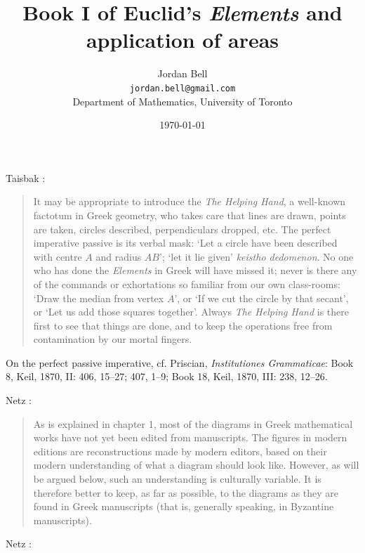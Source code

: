 \documentclass{article}
\begin{document}
\title{Book I of Euclid's {\em Elements} and application of areas} 
\author{Jordan Bell\\ \texttt{jordan.bell@gmail.com}\\Department of Mathematics, University of Toronto}
\date{\today}

\maketitle

Taisbak \cite[pp.~28--29]{data}:

\begin{quote}
It may be appropriate to introduce the {\em The Helping Hand}, a well-known factotum in Greek
geometry, who takes care that lines are drawn, points are taken, circles described,
perpendiculars dropped, etc. The perfect imperative passive is its verbal mask: `Let a
circle have been described with centre $A$ and radius $AB$'; `let it lie given' {\em keistho
dedomenon}. No one who has done the {\em Elements} in Greek will have missed it; never is
there any of the commands or exhortations so familiar from our own class-rooms:
`Draw the median from vertex $A$', or `If we cut the circle by that secant', or `Let us add
those squares together'. Always {\em The Helping Hand} is there first to see that things are
done, and to keep the operations free from contamination by our mortal fingers.
\end{quote}

On the perfect passive imperative, cf.
Priscian, {\em Institutiones Grammaticae}: Book 8, Keil, 1870, II: 406, 15--27; 407, 1--9;
Book 18, Keil, 1870, III: 238, 12--26.






Netz \cite[p.~xvii]{netz}:

\begin{quote}
As is explained in chapter 1, most of the diagrams in Greek mathematical
works have not yet been edited from manuscripts. The figures
in modern editions are reconstructions made by modern editors, based
on their modern understanding of what a diagram should look like.
However, as will be argued below, such an understanding is culturally
variable. It is therefore better to keep, as far as possible, to the diagrams
as they are found in Greek manuscripts (that is, generally
speaking, in Byzantine manuscripts).
\end{quote}

Netz \cite[p.~16]{netz}:
\end{document}
